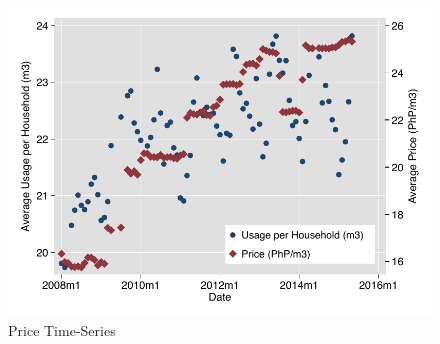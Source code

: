 \documentclass[12pt,table]{article}
\newcommand{\regtext}{
Standard errors are clustered at the small-area level (in parentheses).  The water service area is divided into 2,974 small-areas.
\textsuperscript{c} p$<$0.10,\textsuperscript{b} p$<$0.05,\textsuperscript{a} p$<$0.01 \,\,
}
\begin{document}



% 







\begin{figure}
\begin{center}
\caption{Price Time-Series}\label{figure:pricetimeseries}
\includegraphics[scale=1]{tables/price_time_series.pdf}
\end{center}
\end{figure}
\end{document}
